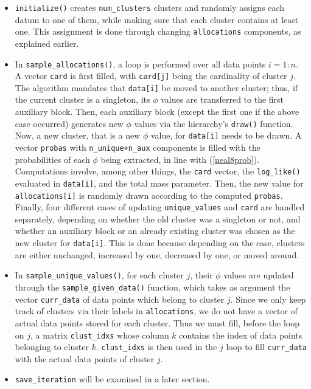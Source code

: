 \begin{itemize}
	\item \verb|initialize()| creates \verb|num_clusters| clusters and randomly assigns each datum to one of them, while making sure that each cluster contains at least one.
	This assignment is done through changing \verb|allocations| components, as explained earlier.
	\item In \verb|sample_allocations()|, a loop is performed over all data points $i=1:n$.
	A vector \verb|card| is first filled, with \verb|card[j]| being the cardinality of cluster $j$.
	The algorithm mandates that \verb|data[i]| be moved to another cluster; thus, if the current cluster is a singleton, its $\phi$ values are transferred to the first auxiliary block.
	Then, each auxiliary block (except the first one if the above case occurred) generates new $\phi$ values via the hierarchy's \verb|draw()| function.
	Now, a new cluster, that is a new $\phi$ value, for \verb|data[i]| needs to be drawn.
	A vector \verb|probas| with \verb|n_unique+n_aux| components is filled with the probabilities of each $\phi$ being extracted, in line with (\ref{neal8prob}).
	Computations involve, among other things, the \verb|card| vector, the \verb|log_like()| evaluated in \verb|data[i]|, and the total mass parameter.
	Then, the new value for \verb|allocations[i]| is randomly drawn according to the computed \verb|probas|.
	Finally, four different cases of updating \verb|unique_values| and \verb|card| are handled separately, depending on whether the old cluster was a singleton or not, and whether an auxiliary block or an already existing cluster was chosen as the new cluster for \verb|data[i]|.
	This is done because depending on the case, clusters are either unchanged, increased by one, decreased by one, or moved around.
	\item In \verb|sample_unique_values()|, for each cluster $j$, their $\phi$ values are updated through the \verb|sample_given_data()| function, which takes as argument the vector \verb|curr_data| of data points which belong to cluster $j$.
	Since we only keep track of clusters via their labels in \verb|allocations|, we do not have a vector of actual data points stored for each cluster.
	Thus we must fill, before the loop on $j$, a matrix \verb|clust_idxs| whose column $k$ contains the index of data points belonging to cluster $k$.
	\verb|clust_idxs| is then used in the $j$ loop to fill \verb|curr_data| with the actual data points of cluster $j$.
	\item \verb|save_iteration| will be examined in a later section.
\end{itemize}

